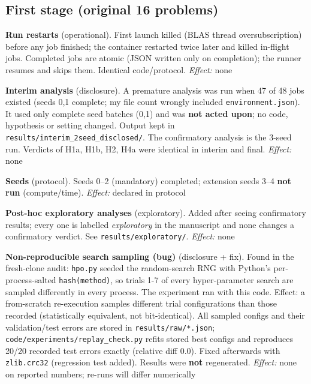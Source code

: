 \subsection*{First stage (original 16 problems)}
\begin{description}\setlength{\itemsep}{2pt}
\item[D1] \textbf{Run restarts} (operational). First launch killed (BLAS thread oversubscription) before any job finished; the container restarted twice later and killed in-flight jobs. Completed jobs are atomic (JSON written only on completion); the runner resumes and skips them. Identical code/protocol. \emph{Effect:} none
\item[D2] \textbf{Interim analysis} (disclosure). A premature analysis was run when 47 of 48 jobs existed (seeds 0,1 complete; my file count wrongly included \texttt{environment.json}). It used only complete seed batches (0,1) and was \textbf{not acted upon}; no code, hypothesis or setting changed. Output kept in \texttt{results/\allowbreak{}interim\_\allowbreak{}2seed\_\allowbreak{}disclosed/\allowbreak{}}. The confirmatory analysis is the 3-seed run. Verdicts of H1a, H1b, H2, H4a were identical in interim and final. \emph{Effect:} none
\item[D3] \textbf{Seeds} (protocol). Seeds 0--2 (mandatory) completed; extension seeds 3--4 \textbf{not run} (compute/time). \emph{Effect:} declared in protocol
\item[D4] \textbf{Post-hoc exploratory analyses} (exploratory). Added after seeing confirmatory results; every one is labelled \emph{exploratory} in the manuscript and none changes a confirmatory verdict. See \texttt{results/\allowbreak{}exploratory/\allowbreak{}}. \emph{Effect:} none
\item[D5] \textbf{Non-reproducible search sampling (bug)} (disclosure + fix). Found in the fresh-clone audit: \texttt{hpo.py} seeded the random-search RNG with Python's per-process-salted \texttt{hash(method)}, so trials 1-7 of every hyper-parameter search are sampled differently in every process. The experiment ran with this code. Effect: a from-scratch re-execution samples different trial configurations than those recorded (statistically equivalent, not bit-identical). All sampled configs and their validation/test errors are stored in \texttt{results/\allowbreak{}raw/\allowbreak{}*.json}; \texttt{code/\allowbreak{}experiments/\allowbreak{}replay\_\allowbreak{}check.py} refits stored best configs and reproduces 20/20 recorded test errors exactly (relative diff 0.0). Fixed afterwards with \texttt{zlib.crc32} (regression test added). Results were \textbf{not} regenerated. \emph{Effect:} none on reported numbers; re-runs will differ numerically
\end{description}

